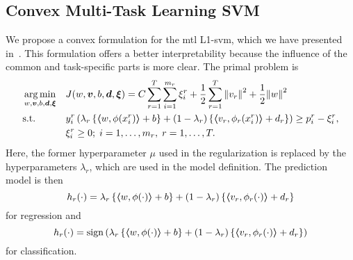 \subsection{Convex Multi-Task Learning SVM}

We propose a convex formulation for the \acrshort{mtl} L1-\acrshort{svm}, which we have presented in~\cite{RuizAD19}. This formulation offers a better interpretability because the influence of the common and task-specific parts is more clear. 
%
The primal problem is
\begin{equation}\label{eq:svmmtl_primal_convex}
    \begin{aligned}
    & \argmin_{w, \fv{v}, b, \fv{d}, \fv{\xi}}
    & & {J({w}, \fv{v}, b, \fv{d}, \fv{\xi}) = C \sum_{r= 1}^T \sum_{i=1}^{m_r} {\xi_{i}^r} + \frac{1}{2} \sum_{r= 1}^T{\norm{{v}_r}^2} + \frac{1}{2} {\norm{{w}}}^2} \\
    & \text{s.t.}
    & & y_{i}^r \left(\lambda_r \left\lbrace \dotp{w}{\phi(x_{i}^r)} + b  \right\rbrace + (1 - \lambda_r) \left\lbrace \dotp{{v}_r}{\phi_r(x_{i}^r)} + d_r \right\rbrace  \right) \geq p_{i}^r - \xi_{i}^r ,  \\
    & & & \xi_{i}^r \geq 0; \;  i=1 , \dotsc , m_r, \;  r= 1,\dotsc, T  . \\
    \end{aligned}
\end{equation}
Here, the former hyperparameter $\mu$ used in the regularization is replaced by the hyperparameters $\lambda_r$, which are used in the model definition. The prediction model is then
\begin{equation}
    \nonumber
    h_r({\cdot}) = \lambda_r \left\lbrace \bm{\left\langle} w, \phi(\cdot) \bm{\right\rangle} + b  \right\rbrace + (1 - \lambda_r) \left\lbrace \bm{\left\langle} {v}_r, \phi_r(\cdot) \bm{\right\rangle} + d_r \right\rbrace
\end{equation}
for regression and 
\begin{equation}
    \nonumber
    h_r({\cdot}) = \operatorname{sign}{ \left(\lambda_r \left\lbrace \bm{\left\langle} w, \phi(\cdot) \bm{\right\rangle} + b  \right\rbrace + (1 - \lambda_r) \left\lbrace \bm{\left\langle} {v}_r, \phi_r(\cdot) \bm{\right\rangle} + d_r \right\rbrace \right)}
\end{equation}
for classification.
%

